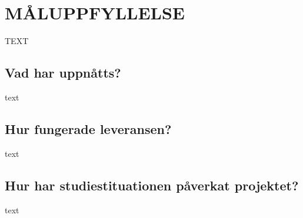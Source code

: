 \documentclass[efterstudie/studie.tex]{subfiles}
\begin{document}
\section{MÅLUPPFYLLELSE}
TEXT
\subsection{Vad har uppnåtts?}
text

\subsection{Hur fungerade leveransen?}
text

\subsection{Hur har studiestituationen påverkat projektet?}
text
\end{document}
